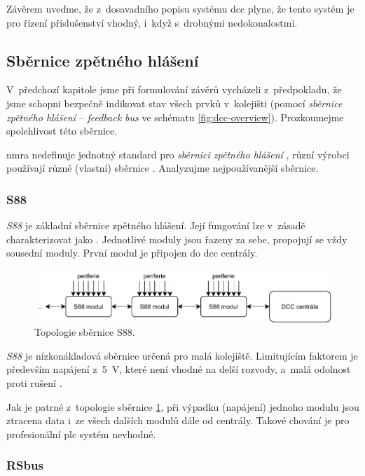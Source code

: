 Závěrem uveďme, že z~dosavadního popisu systému \gls{dcc} plyne, že tento
systém je pro řízení příslušenství vhodný, i~když s~drobnými nedokonalostmi.

\subsection{Sběrnice zpětného hlášení}

V~předchozí kapitole jsme při formulování závěrů vycházeli z~předpokladu, že
jsme schopni bezpečně indikovat stav všech prvků v~kolejišti (pomocí
\textit{sběrnice zpětného hlášení} – \textit{feedback bus} ve schématu
\ref{fig:dcc-overview}). Prozkoumejme spolehlivost této sběrnice.

\gls{nmra} nedefinuje jednotný standard pro \textit{sběrnici zpětného hlášení}
\cite{dcc_specs:web}, různí výrobci používají různé (vlastní) sběrnice
\cite{dcc_feedbacks:web}. Analyzujme nejpoužívanější sběrnice.

\subsubsection{S88}

\textit{S88} je základní sběrnice zpětného hlášení. Její fungování lze v~zásadě
charakterizovat jako  \cite{s88:web}. Jednotlivé
moduly jsou řazeny za sebe, propojují se vždy sousední moduly. První modul je
připojen do \gls{dcc} centrály.

\begin{figure}[ht!]
\includegraphics[width=\textwidth]{data/s88.pdf}
\caption{Topologie sběrnice S88.}
\label{fig:s88-topology}
\end{figure}

\textit{S88} je nízkonákladová sběrnice určená pro malá kolejiště. Limitujícím
faktorem je především napájení z~5~V, které není vhodné na delší rozvody,
a~malá odolnost proti rušení \cite{s88:web}.

Jak je patrné z~topologie sběrnice \ref{fig:s88-topology}, při výpadku
(napájení) jednoho modulu jsou ztracena data i~ze všech dalších modulů dále od
centrály. Takové chování je pro profesionální \gls{plc} systém nevhodné.

\subsubsection{RSbus}

